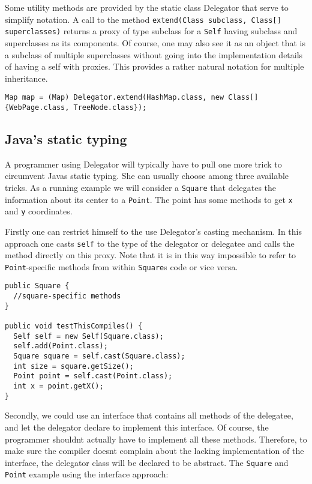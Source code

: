 \documentclass[a4paper,12pt]{book}
\begin{document}
Some utility methods are provided by the static class Delegator that serve to simplify notation. A call to the method \verb|extend(Class subclass, Class[] superclasses)| returns a proxy of type subclass for a \verb|Self| having subclass and superclasses as its components. Of course, one may also see it as an object that is a subclass of multiple superclasses without going into the implementation details of having a self with proxies. This provides a rather natural notation for multiple inheritance.

\begin{verbatim}
Map map = (Map) Delegator.extend(HashMap.class, new Class[]{WebPage.class, TreeNode.class});
\end{verbatim}

\subsection*{Java's static typing}
A programmer using Delegator will typically have to pull one more trick to circumvent Javas static typing. She can usually choose among three available tricks. As a running example we will consider a \verb|Square| that delegates the information about its center to a \verb|Point|. The point has some methods to get \verb|x| and \verb|y| coordinates.

Firstly one can restrict himself to the use Delegator's casting mechanism. In this approach one casts \verb|self| to the type of the delegator or delegatee and calls the method directly on this proxy. Note that it is in this way impossible to refer to \verb|Point|-specific methods from within \verb|Square|s code or vice versa. 

\begin{verbatim}
public Square {
  //square-specific methods
}

public void testThisCompiles() {
  Self self = new Self(Square.class);
  self.add(Point.class);
  Square square = self.cast(Square.class);
  int size = square.getSize();
  Point point = self.cast(Point.class);
  int x = point.getX();
}
\end{verbatim}

Secondly, we could use an interface that contains all methods of the delegatee, and let the  delegator declare to implement this interface. Of course, the programmer shouldnt actually have to implement all these methods. Therefore, to make sure the compiler doesnt complain about the lacking implementation of the interface, the delegator class will be declared to be abstract. The \verb|Square| and \verb|Point| example using the interface approach:
\end{document}
